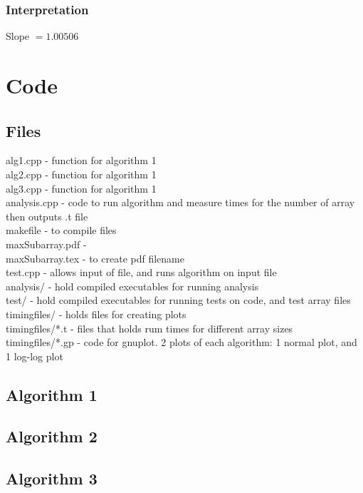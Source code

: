 \documentclass[a4paper,10pt]{article}
\begin{document}
			\subsubsection{Interpretation}
				Slope $= 1.00506$

	\newpage
	\section{Code}
		\subsection{Files}
			alg1.cpp - function for algorithm 1\\
			alg2.cpp - function for algorithm 1\\
			alg3.cpp - function for algorithm 1\\
			analysis.cpp - code to run algorithm and measure times for the number of array then outputs .t file\\
			makefile - to compile files\\
			maxSubarray.pdf - \\
			maxSubarray.tex - to create pdf filename\\
			test.cpp - allows input of file, and runs algorithm on input file\\
			analysis/ - hold compiled executables for running analysis\\
			test/ - hold compiled executables for running tests on code, and test array files\\
			timingfiles/ - holds files for creating plots\\
			timingfiles/*.t - files that holds rum times for different array sizes\\
			timingfiles/*.gp - code for gnuplot. 2 plots of each algorithm: 1 normal plot, and 1 log-log plot
		\subsection{Algorithm 1}
		
		\newpage
		\subsection{Algorithm 2}
		
		\newpage
		\subsection{Algorithm 3}
		
		
\end{document}
